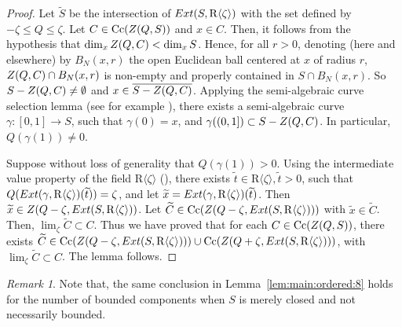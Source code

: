 \documentclass[10pt]{amsart}
\theoremstyle{definition}
\theoremstyle{remark}
\newtheorem{remark}{Remark}
\numberwithin{equation}{section}
\newcommand {\R} {\mathrm{R}}
\newcommand {\ZZ} {{\rm Z}}
\newcommand {\la}   {{\langle}}
\newcommand {\ra}   {{\rangle}}
\newcommand {\E} {{\rm Ext}}
\newcommand{\Cc}{\mathrm{Cc}}
\begin{document}
\begin{proof}
Let $\widetilde{S}$ be the intersection of $\E(S,\R\la\zeta\ra)$ with the set defined by $-\zeta \leq Q \leq \zeta$.
Let $C \in \Cc(\ZZ(Q,S))$ and $x \in C$. Then, it follows from the hypothesis that $\dim_x \ZZ(Q,C) < \dim_x S$. Hence, for all $r >0$,
denoting (here and elsewhere) by $B_N(x,r)$ the open Euclidean ball centered at $x$ of radius $r$,
$\ZZ(Q,C) \cap B_N(x,r)$ is non-empty and properly contained in
$S \cap B_N(x,r)$. So $S - \ZZ(Q,C) \neq \emptyset$ and $x \in \overline{S - \ZZ(Q,C)}$. Applying the semi-algebraic curve selection lemma (see for example \cite[Theorem 3.19]{BPRbook2}), there exists a semi-algebraic curve $\gamma:[0,1] \rightarrow S$, such that $\gamma(0) = x$, and 
$\gamma((0,1]) \subset S - \ZZ(Q,C)$. In particular, $Q(\gamma(1)) \neq 0$. 

Suppose without loss of generality that $Q(\gamma(1)) > 0$. Using the intermediate value property of the field $\R\la\zeta\ra$ (\cite[Proposition 4.3]{BPRbook2}), there exists 
$\widetilde{t} \in \R\la\zeta\ra, \widetilde{t} > 0$, such that 
$Q(\E(\gamma,\R\la\zeta\ra)(\widetilde{t})) = \zeta$, and let
$\widetilde{x} = \E(\gamma,\R\la\zeta\ra)(\widetilde{t})$. Then
$\widetilde{x} \in \ZZ(Q-\zeta, \E(S,\R\la\zeta\ra))$. Let $\widetilde{C} \in \Cc(\ZZ(Q-\zeta, \E(S,\R\la\zeta\ra)))$ with  $\widetilde{x} \in \widetilde{C}$.
Then, $\lim_\zeta \widetilde{C} \subset C$. 
Thus we have proved that for each $C \in \Cc(\ZZ(Q,S))$,  there exists 
$\widetilde{C} \in \Cc(\ZZ(Q-\zeta, \E(S,\R\la\zeta\ra))) \cup \Cc(\ZZ(Q+\zeta, \E(S,\R\la\zeta\ra)))$, with $\lim_\zeta \widetilde{C} \subset C$. The lemma follows.
\end{proof}

\begin{remark}
\label{rem:lem:main:ordered:8}
   Note that, the same conclusion in Lemma~\ref{lem:main:ordered:8} holds for the number of bounded components when $S$ is merely closed and not necessarily bounded.
\end{remark}
\end{document}
